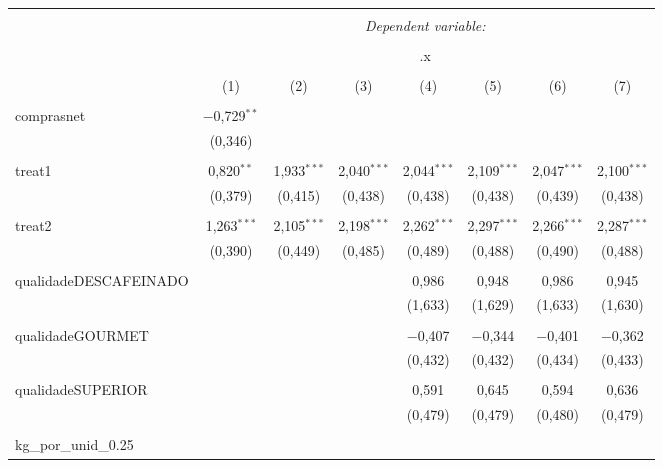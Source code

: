 
\begin{table}[!htbp] \centering 
  \caption{} 
  \label{} 
\begin{tabular}{@{\extracolsep{5pt}}lccccccc} 
\\[-1.8ex]\hline 
\hline \\[-1.8ex] 
 & \multicolumn{7}{c}{\textit{Dependent variable:}} \\ 
\cline{2-8} 
\\[-1.8ex] & \multicolumn{7}{c}{.x} \\ 
\\[-1.8ex] & (1) & (2) & (3) & (4) & (5) & (6) & (7)\\ 
\hline \\[-1.8ex] 
 comprasnet & $-$0,729$^{**}$ &  &  &  &  &  &  \\ 
  & (0,346) &  &  &  &  &  &  \\ 
  & & & & & & & \\ 
 treat1 & 0,820$^{**}$ & 1,933$^{***}$ & 2,040$^{***}$ & 2,044$^{***}$ & 2,109$^{***}$ & 2,047$^{***}$ & 2,100$^{***}$ \\ 
  & (0,379) & (0,415) & (0,438) & (0,438) & (0,438) & (0,439) & (0,438) \\ 
  & & & & & & & \\ 
 treat2 & 1,263$^{***}$ & 2,105$^{***}$ & 2,198$^{***}$ & 2,262$^{***}$ & 2,297$^{***}$ & 2,266$^{***}$ & 2,287$^{***}$ \\ 
  & (0,390) & (0,449) & (0,485) & (0,489) & (0,488) & (0,490) & (0,488) \\ 
  & & & & & & & \\ 
 qualidadeDESCAFEINADO &  &  &  & 0,986 & 0,948 & 0,986 & 0,945 \\ 
  &  &  &  & (1,633) & (1,629) & (1,633) & (1,630) \\ 
  & & & & & & & \\ 
 qualidadeGOURMET &  &  &  & $-$0,407 & $-$0,344 & $-$0,401 & $-$0,362 \\ 
  &  &  &  & (0,432) & (0,432) & (0,434) & (0,433) \\ 
  & & & & & & & \\ 
 qualidadeSUPERIOR &  &  &  & 0,591 & 0,645 & 0,594 & 0,636 \\ 
  &  &  &  & (0,479) & (0,479) & (0,480) & (0,479) \\ 
  & & & & & & & \\ 
 kg\_por\_unid\_0.25 &  &  &  &  &  &  &  \\ 

\end{tabular}
\end{table}
